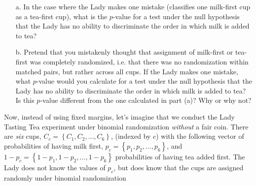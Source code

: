 \documentclass{article}
\begin{document}
\begin{itemize}


\item[a.]  In the case where the Lady makes one mistake (classifies
  one milk-first cup as a tea-first cup), what is the $p$-value for a
  test under the null hypothesis that the Lady has no ability to
  discriminate the order in which milk is added to tea?

\item[b.] Pretend that you mistakenly thought that assignment of
  milk-first or tea-first was completely randomized, i.e. that there
  was no randomization within matched pairs, but rather across all
  cups. If the Lady makes one mistake, what $p$-value would you
  calculate for a test under the null hypothesis that the Lady has no
  ability to discriminate the order in which milk is added to tea?  Is
  this $p$-value different from the one calculated in part (a)? Why or
  why not?



\end{itemize}

Now, instead of using fixed margins, let’s imagine that we conduct the
Lady Tasting Tea experiment under binomial randomization {\em without}
a fair coin.  There are {\em six} cups, $C_c = \left\{ C_1, C_2,...,C_6 \right\}$,
(indexed by $c$) with the following vector of probabilities of having
milk first, $p_c= \left\{ p_1, p_2,...,p_6 \right\}$, and $1-p_c=
\left\{1-p_1, 1-p_2,...,1-p_6 \right\}$ probabilities of having tea
added first. The Lady does not know the values of $p_c$, but does know
that the cups are assigned randomly under binomial randomization

\end{document}
